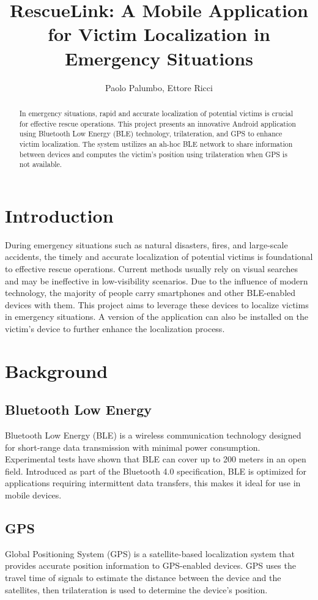 \documentclass{article}
\title{RescueLink: A Mobile Application for Victim Localization in Emergency Situations}
\author{Paolo Palumbo, Ettore Ricci}
\begin{document}
\maketitle
\begin{abstract}
In emergency situations, rapid
and accurate localization of potential 
victims is crucial for effective rescue operations.
This project presents an innovative Android 
application using Bluetooth Low Energy (BLE) 
technology, trilateration, and GPS to enhance 
victim localization. 
The system ustilizes an ah-hoc BLE network
to share information between devices and 
computes the victim's position using trilateration 
when GPS is not available.
\end{abstract}
\begin{multicols}{2}
\section{Introduction}
During emergency situations such as natural 
disasters, fires, and large-scale accidents, 
the timely and accurate localization of 
potential victims is foundational to effective
rescue operations. 
Current methods usually rely on visual searches
and may be ineffective in low-visibility scenarios.
Due to the influence of modern technology, 
the majority of people carry smartphones and other
BLE-enabled devices with them. 
This project aims to leverage these devices to
localize victims in emergency situations.
A version of the application can also be installed
on the victim's device to further enhance the
localization process.
\section{Background}
\subsection{Bluetooth Low Energy}
Bluetooth Low Energy (BLE) is a wireless 
communication technology designed for short-range
data transmission with minimal power consumption. 
Experimental tests have shown that BLE can cover 
up to 200 meters in an open 
field\cite{Lodeiro_Santiago_2017}.
Introduced as part of the Bluetooth 4.0 
specification, BLE is optimized for applications 
requiring intermittent data transfers, this makes
it ideal for use in mobile devices.
\subsection{GPS}
Global Positioning System (GPS) is a 
satellite-based localization system that
provides accurate position information
to GPS-enabled devices.
GPS uses the travel time of signals to estimate
the distance between the device and the satellites, 
then trilateration is used to determine the 
device's position.

\end{multicols}
\end{document}
